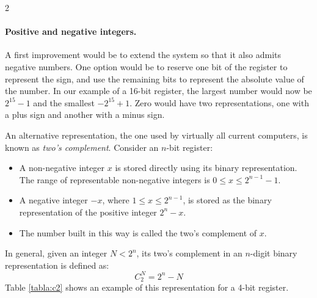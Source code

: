 \begin{paracol}{2}
\paragraph{Positive and negative integers.} A first improvement would be to extend the system so that it also admits negative numbers. One option would be to reserve one bit of the register to represent the sign, and use the remaining bits to represent the absolute value of the number. In our example of a 16-bit register, the largest number would now be $2^{15}-1$ and the smallest $-2^{15}+1$. Zero would have two representations, one with a plus sign and another with a minus sign.

An alternative representation, the one used by virtually all current computers, is known as \emph{two's complement}.  Consider an $n$-bit register:
\begin{itemize}
    \item A non-negative integer $x$ is stored directly using its binary representation. The range of representable non-negative integers is $0 \le x \le 2^{n-1}-1$.
    \item A negative integer $-x$, where $1 \le x \le 2^{n-1}$, is stored as the binary representation of the positive integer $2^{n}-x$.
    \item The number built in this way is called the two's complement of $x$.
\end{itemize}
In general, given an integer $N<2^n$, its two's complement in an $n$-digit binary representation is defined as:
\begin{equation*}
 C_2^N=2^n-N
\end{equation*}
Table \ref{tabla:c2} shows an example of this representation for a 4-bit register.
\end{paracol}

